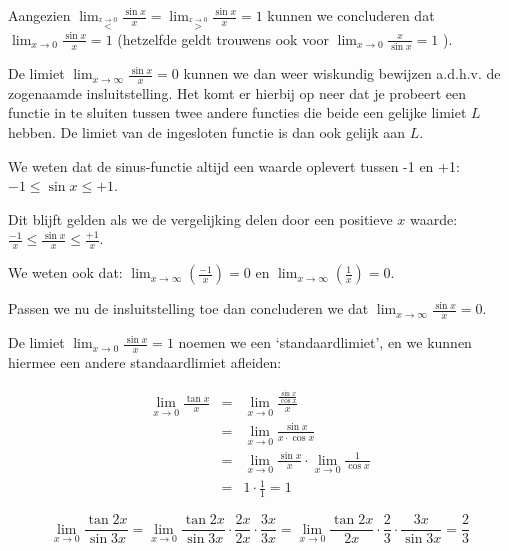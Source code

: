 Aangezien $\lim_{\overset{x\rightarrow0}{<}}\frac{\sin x}{x}=\lim_{\overset{x\rightarrow0}{>}}\frac{\sin x}{x}=1$
kunnen we concluderen dat $\lim_{x\rightarrow0}\frac{\sin x}{x}=1$
(hetzelfde geldt trouwens ook voor $\lim_{x\rightarrow0}\frac{x}{\sin x}=1$
).


De limiet $\lim_{x\rightarrow\infty}\frac{\sin x}{x}=0$
kunnen we dan weer wiskundig bewijzen a.d.h.v. de zogenaamde insluitstelling.
Het komt er hierbij op neer dat je probeert een functie in te sluiten
tussen twee andere functies die beide een gelijke limiet $L$ hebben.
De limiet van de ingesloten functie is dan ook gelijk aan $L$.

We weten dat de sinus-functie altijd een waarde oplevert
tussen -1 en +1: $-1\leq\sin x\leq+1$.

Dit blijft gelden als we de vergelijking delen door een
positieve $x$ waarde: $\frac{-1}{x}\leq\frac{\sin x}{x}\leq\frac{+1}{x}$.

We weten ook dat: $\lim_{x\to\infty}\left(\frac{-1}{x}\right)=0$
en $\lim_{x\to\infty}\left(\frac{1}{x}\right)=0$.

Passen we nu de insluitstelling toe dan concluderen we dat
$\lim_{x\rightarrow\infty}\frac{\sin x}{x}=0$.


De limiet $\lim_{x\rightarrow0}\frac{\sin x}{x}=1$
noemen we een \textquoteleft standaardlimiet\textquoteright, en we kunnen hiermee een andere standaardlimiet
afleiden:

\begin{eqnarray*}
\lim_{x\rightarrow0}\frac{\tan x}{x}&=&\lim_{x\rightarrow0}\frac{\frac{\sin x}{\cos x}}{x}\\
&=&\lim_{x\rightarrow0}\frac{\sin x}{x\cdot \cos x}\\
&=&\lim_{x\rightarrow0}\frac{\sin x}{x}\cdot \lim_{x\rightarrow0}\frac{1}{\cos x}\\
&=&1\cdot \frac{1}{1}=1
\end{eqnarray*}


\begin{voorbeeld}

\begin{equation*}
\lim_{x\rightarrow0}\frac{\tan2x}{\sin3x}=\lim_{x\rightarrow0}\frac{\tan2x}{\sin3x}\cdot \frac{2x}{2x}\cdot \frac{3x}{3x}=\lim_{x\rightarrow0}\frac{\tan2x}{2x}\cdot \frac{2}{3}\cdot \frac{3x}{\sin3x}=\frac{2}{3}
\end{equation*}

\end{voorbeeld}



